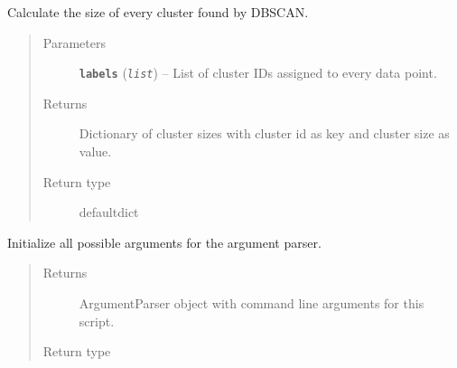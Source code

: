 \documentclass[letterpaper,10pt,english]{sphinxmanual}
\begin{document}

\begin{fulllineitems}
\label{src.clustering:src.clustering.cluster_mappings.get_cluster_size}
Calculate the size of every cluster found by DBSCAN.
\begin{quote}\begin{description}
\item[{Parameters}] \leavevmode
\textbf{\texttt{labels}} (\emph{\texttt{list}}) -- List of cluster IDs assigned to every data point.

\item[{Returns}] \leavevmode
Dictionary of cluster sizes with cluster id as key and cluster size as value.

\item[{Return type}] \leavevmode
defaultdict

\end{description}\end{quote}

\end{fulllineitems}


\begin{fulllineitems}
\label{src.clustering:src.clustering.cluster_mappings.init_argparser}
Initialize all possible arguments for the argument parser.
\begin{quote}\begin{description}
\item[{Returns}] \leavevmode
ArgumentParser object with command line arguments for this script.

\item[{Return type}] \leavevmode
{}

\end{description}\end{quote}

\end{fulllineitems}

\end{document}
